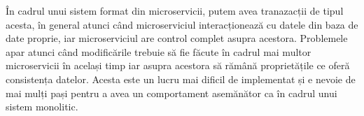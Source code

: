 În cadrul unui sistem format din microservicii, putem avea tranazacții de tipul acesta,
în general atunci când microserviciul interacționează cu datele din baza de date proprie,
iar microserviciul are control complet asupra acestora. Problemele apar atunci când 
modificările trebuie să fie făcute în cadrul mai multor microservicii în același timp
iar asupra acestora să rămână proprietățile ce oferă consistența datelor. Acesta este un
lucru mai dificil de implementat și e nevoie de mai mulți pași pentru a avea un comportament
asemănător ca în cadrul unui sistem monolitic.
